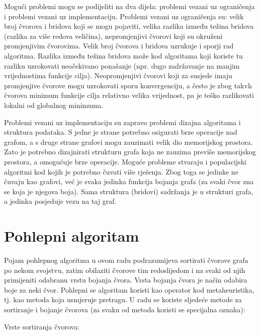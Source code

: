 \documentclass[times, utf8, diplomski, numeric]{fer}
\begin{document}
Mogući problemi mogu se podijeliti na dva dijela: problemi vezani uz ograničenja i problemi vezani uz implementaciju. Problemi vezani uz ograničenja su: velik broj čvorova i bridova koji se mogu pojaviti, velika razlika između težina bridova (razlika za više redova veličina), nepromjenjivi čvorovi koji su okruženi promjenjivim čvorovima. Velik broj čvorova i bridova uzrukuje i sporji rad algoritma. Razlika između težina bridova može kod algoritama koji koriste tu razliku uzrokovati neočekivano ponašanje (npr. dugo zadržavanje na manjim vrijednostima funkcije cilja). Neopromjenjivi čvorovi koji za susjede imaju promjenjive čvorove mogu uzrokovati sporu konvergenciju, a često je zbog takvh čvorova minimum funkcije cilja relativno velika vrijednost, pa je teško razlikovati lokalni od globalnog minimuma. 

Problemi vezani uz implementaciju su zapravo problemi dizajna algoritama i struktura podataka. S jedne je strane potrebno osigurati brze operacije nad grafom, a s druge strane grafovi mogu zauzimati velik dio memorijskog prostora. Zato je potrebno dizajnirati strukturu grafa koja ne zauzima previše memorijskog prostora, a omogućuje brze operacije. Moguće probleme stvaraju i populacijski algoritmi kod kojih je potrebno čuvati više rješenja. Zbog toga se jedinke ne čuvaju kao grafovi, već je svaka jedinka funkcija bojanja grafa (za svaki čvor zna se koja je njegova boja). Sama struktura (bridovi) sadržanja je u strukturi grafa, a jedinka posjeduje vezu na taj graf.

\section{Pohlepni algoritam}

Pojam pohlepnog algoritma u ovom radu podrazumijeva sortirati čvorove grafa po nekom svojstvu, zatim obilaziti čvorove tim redoslijedom i na svaki od njih primijeniti odabranu vrstu bojanja čvora. Vrsta bojanja čvora je način odabira boje za neki čvor. Pohlepni se algoritam koristi kao operator kod metaheuristika, tj. kao metoda koja usmjeruje pretragu.
U radu se koriste sljedeće metode za sortiranje i bojanje čvorova (za svaku od metoda koristi se specijalna oznaka):

Vrste sortiranja čvorova:
\end{document}
